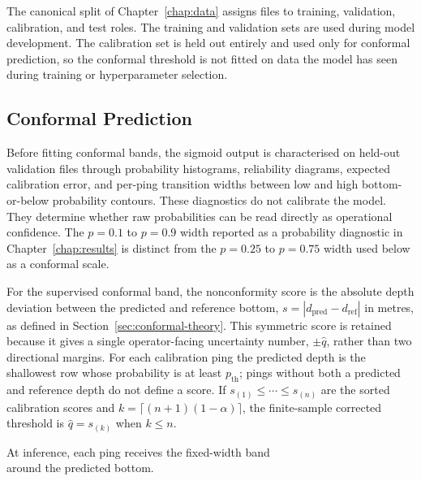 The canonical split of Chapter~\ref{chap:data} assigns files to training, validation, calibration, and test roles. The training and validation sets are used during model development. The calibration set is held out entirely and used only for conformal prediction, so the conformal threshold is not fitted on data the model has seen during training or hyperparameter selection.

\subsection{Conformal Prediction}
\label{sec:conformal-score-method}

Before fitting conformal bands, the sigmoid output is characterised on held-out validation files through probability histograms, reliability diagrams, expected calibration error, and per-ping transition widths between low and high bottom-or-below probability contours. These diagnostics do not calibrate the model. They determine whether raw probabilities can be read directly as operational confidence. The $p=0.1$ to $p=0.9$ width reported as a probability diagnostic in Chapter~\ref{chap:results} is distinct from the $p=0.25$ to $p=0.75$ width used below as a conformal scale.

For the supervised conformal band, the nonconformity score is the absolute depth deviation between the predicted and reference bottom, $s = |d_\text{pred} - d_\text{ref}|$ in metres, as defined in Section~\ref{sec:conformal-theory}. This symmetric score is retained because it gives a single operator-facing uncertainty number, $\pm \hat q$, rather than two directional margins. For each calibration ping the predicted depth is the shallowest row whose probability is at least $p_{\mathrm{th}}$; pings without both a predicted and reference depth do not define a score. If $s_{(1)} \leq \cdots \leq s_{(n)}$ are the sorted calibration scores and $k=\lceil (n+1)(1-\alpha)\rceil$, the finite-sample corrected threshold is $\hat q=s_{(k)}$ when $k \leq n$.

At inference, each ping receives the fixed-width band
\begin{equation}
    [d_\text{pred} - \hat q,\, d_\text{pred} + \hat q]
\end{equation}
around the predicted bottom.


